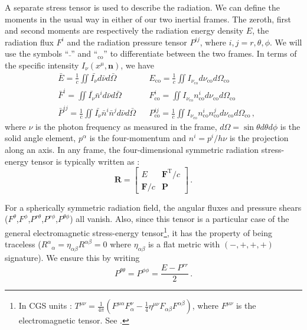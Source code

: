 \documentclass[../main.tex]{subfiles}
\begin{document}
A separate stress tensor is used to describe the radiation. We can define the moments in the usual way in either of our two inertial frames. The zeroth, first and second moments are respectively the radiation energy density $E$, the radiation flux $F^i$ and the radiation pressure tensor $P^{ij}$, where $i,j=r,\theta,\phi$.  We will use the symbols ``$\bar{\;}$'' and ``$_\text{co}$'' to differentiate between the two frames.  In terms of the specific intensity $I_\nu(x^\mu,\bm{n})$, we have
\begin{align}
    &\bar{E}=\frac{1}{c}\iint \bar{I_\nu}d\bar{\nu}d\bar{\Omega}&& E_\text{co}=\frac{1}{c}\iint I_{\nu_\text{co}}d\nu_\text{co}d\Omega_\text{co}\nonumber\\
    &\bar{F}^i=\iint \bar{I_\nu}\bar{n}^id\bar{\nu}d\bar{\Omega}&& F^i_\text{co}=\iint I_{\nu_\text{co}}n^i_\text{co}d\nu_\text{co}d\Omega_\text{co}\nonumber\\
    &\bar{P}^{ij}=\frac{1}{c}\iint \bar{I_\nu}\bar{n}^i\bar{n}^jd\bar{\nu}d\bar{\Omega}&& P^{ij}_\text{co}=\frac{1}{c}\iint I_{\nu_\text{co}}n^i_\text{co}n^j_\text{co}d\nu_\text{co}d\Omega_\text{co} \,,
\end{align}
where $\nu$ is the photon frequency as measured in the frame, $d\Omega=\sin\theta d\theta d\phi$ is the solid angle element, $p^\alpha$ is the four-momentum and $n^i=p^i/h\nu$ is the projection along an axis.  In any frame, the four-dimensional symmetric radiation stress-energy tensor is typically written as \citep{MihalasMihalas1984}:
\begin{equation}
    \bm{R}=\begin{bmatrix}E&\bm{F}^\text{T}/c\\\bm{F}/c&\bm{P}\end{bmatrix}\,.
\end{equation}

For a spherically symmetric radiation field, the angular fluxes and pressure shears ($F^\theta$,$F^\phi$,$P^{r\theta}$,$P^{r\phi}$,$P^{\theta\phi}$) all vanish.  Also, since this tensor is a particular case of the general electromagnetic stress-energy tensor\footnote{In CGS units : $T^{\mu\nu}=
\frac{1}{4\pi}\left(F^{\mu\alpha}F^\nu_\alpha-\frac{1}{4}\eta^{\mu\nu}F_{\alpha\beta}F^{\alpha\beta}\right)$, where $F^{\mu\nu}$ is the electromagnetic tensor.  See \citet{Carroll2004}.}, it has the property of being traceless ($R^\alpha{}_\alpha=\eta_{\alpha\beta}R^{\alpha\beta}=0$ where $\eta_{\alpha\beta}$ is a flat metric with $(-,+,+,+)$ signature).  We ensure this by writing
\begin{equation}
    P^{\theta\theta}=P^{\phi\phi}=\frac{E-P^{rr}}{2}\, .
\end{equation}
\end{document}

